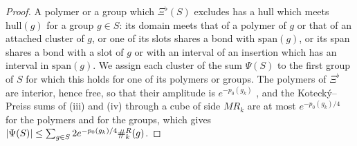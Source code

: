\documentclass[11pt]{preprint}
\DeclarePairedDelimiter{\abs}{\lvert}{\rvert}
\numberwithin{equation}{section}
\theoremstyle{definition}
\theoremstyle{remark}
\theoremstyle{plain}
\begin{document}
\begin{proof}
A polymer or a group which $\Xi^\flat(S)$ excludes has a hull which meets $\mathrm{hull}(g)$ for a group $g \in S$: its domain meets that of a polymer of $g$ or that of an attached cluster of $g$, or one of its slots shares a bond with $\mathrm{span}(g)$, or its span shares a bond with a slot of $g$ or with an interval of an insertion which has an interval in $\mathrm{span}(g)$. We assign each cluster of the sum $\Psi(S)$ to the first group of $S$ for which this holds for one of its polymers or groups. The polymers of $\Xi^\flat$ are interior, hence free, so that their amplitude is $e^{-p_0(g_k)}$ \cite[(1.97)]{BalabanLFR2}, and the Koteck\'y--Preiss sums of (iii) and (iv) through a cube of side $MR_k$ are at most $e^{-p_0(g_k)/4}$ for the polymers and for the groups, which gives $\abs{\Psi(S)} \leq \sum_{g \in S}2e^{-p_0(g_k)/4}\#^R_k(g)$.


\end{proof}
\end{document}
